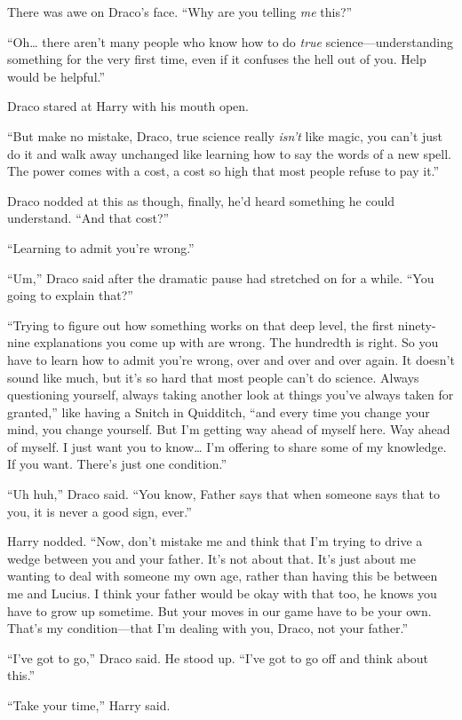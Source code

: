 There was awe on Draco's face. ``Why are you telling \emph{me} this?''

``Oh\ldots{} there aren't many people who know how to do \emph{true}
science---understanding something for the very first time, even if it
confuses the hell out of you. Help would be helpful.''

Draco stared at Harry with his mouth open.

``But make no mistake, Draco, true science really \emph{isn't} like
magic, you can't just do it and walk away unchanged like learning how to
say the words of a new spell. The power comes with a cost, a cost so
high that most people refuse to pay it.''

Draco nodded at this as though, finally, he'd heard something he could
understand. ``And that cost?''

``Learning to admit you're wrong.''

``Um,'' Draco said after the dramatic pause had stretched on for a
while. ``You going to explain that?''

``Trying to figure out how something works on that deep level, the first
ninety-nine explanations you come up with are wrong. The hundredth is
right. So you have to learn how to admit you're wrong, over and over and
over again. It doesn't sound like much, but it's so hard that most
people can't do science. Always questioning yourself, always taking
another look at things you've always taken for granted,'' like having a
Snitch in Quidditch, ``and every time you change your mind, you change
yourself. But I'm getting way ahead of myself here. Way ahead of myself.
I just want you to know\ldots{} I'm offering to share some of my
knowledge. If you want. There's just one condition.''

``Uh huh,'' Draco said. ``You know, Father says that when someone says
that to you, it is never a good sign, ever.''

Harry nodded. ``Now, don't mistake me and think that I'm trying to drive
a wedge between you and your father. It's not about that. It's just
about me wanting to deal with someone my own age, rather than having
this be between me and Lucius. I think your father would be okay with
that too, he knows you have to grow up sometime. But your moves in our
game have to be your own. That's my condition---that I'm dealing with
you, Draco, not your father.''

``I've got to go,'' Draco said. He stood up. ``I've got to go off and
think about this.''

``Take your time,'' Harry said.

